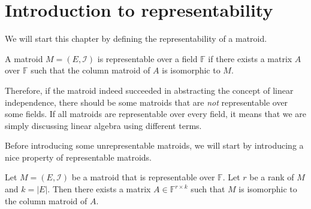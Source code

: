 \section{Introduction to representability}

%

We will start this chapter by defining the representability of a matroid.

\begin{defn}
A matroid $M = (E, \mathcal{I})$ is representable over a field $\mathbb{F}$ if 
there exists a matrix $A$ over $\mathbb{F}$ such that the column matroid of $A$ is isomorphic to $M$.
\end{defn}

Therefore, if the matroid indeed succeeded in abstracting the concept of linear independence, 
there should be some matroids that are \textit{not} representable over some fields.
If all matroids are representable over every field, it means that we are simply discussing linear algebra using different terms.

Before introducing some unrepresentable matroids, we will start by introducing a nice property of representable matroids.

\begin{thm}
Let $M = (E, \mathcal{I})$ be a matroid that is representable over $\mathbb{F}$.
Let $r$ be a rank of $M$ and $k = \lvert E \rvert$.
Then there exists a matrix $A \in \mathbb{F}^{r \times k}$ such that $M$ is isomorphic to the column matroid of $A$.
\end{thm}

